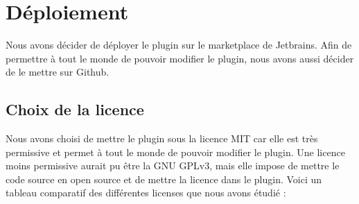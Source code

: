 \chapter{Déploiement}
\noindent Nous avons décider de déployer le plugin sur le marketplace de Jetbrains.
Afin de permettre à tout le monde de pouvoir modifier le plugin, nous avons aussi décider de le mettre sur Github.


\section{Choix de la licence}
\noindent Nous avons choisi de mettre le plugin sous la licence MIT car elle est très permissive et permet à tout le monde de pouvoir modifier le plugin.
Une licence moins permissive aurait pu être la GNU GPLv3, mais elle impose de mettre le code source en open source et de mettre la licence dans le plugin.
\newdoubleline Voici un tableau comparatif des différentes licenses que nous avons étudié :

